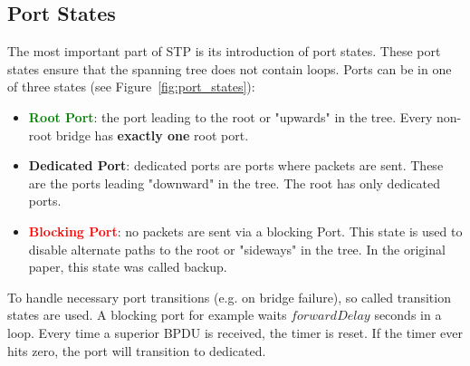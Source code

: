 \subsection*{Port States}
The most important part of STP is its introduction of port states.
These port states ensure that the spanning tree does not contain loops.
Ports can be in one of three states (see Figure~\ref{fig:port_states}):
\begin{itemize}
    \item \textcolor{green}{\textbf{Root Port}}: the port leading to the root or "upwards" in the tree.
        Every non-root bridge has \textbf{exactly one} root port.
    \item \textcolor{blue!80}{\textbf{Dedicated Port}}: dedicated ports are ports where packets are sent. These are the ports leading "downward" in the tree.
        The root has only dedicated ports.
    \item \textcolor{red}{\textbf{Blocking Port}}: no packets are sent via a blocking Port.
        This state is used to disable alternate paths to the root or "sideways" in the tree.
        In the original paper\cite{perlman85}, this state was called backup.
\end{itemize}
To handle necessary port transitions (e.g. on bridge failure), so called transition states are used.
A blocking port for example waits $forwardDelay$ seconds in a loop.
Every time a superior BPDU is received, the timer is reset.
If the timer ever hits zero, the port will transition to dedicated.

